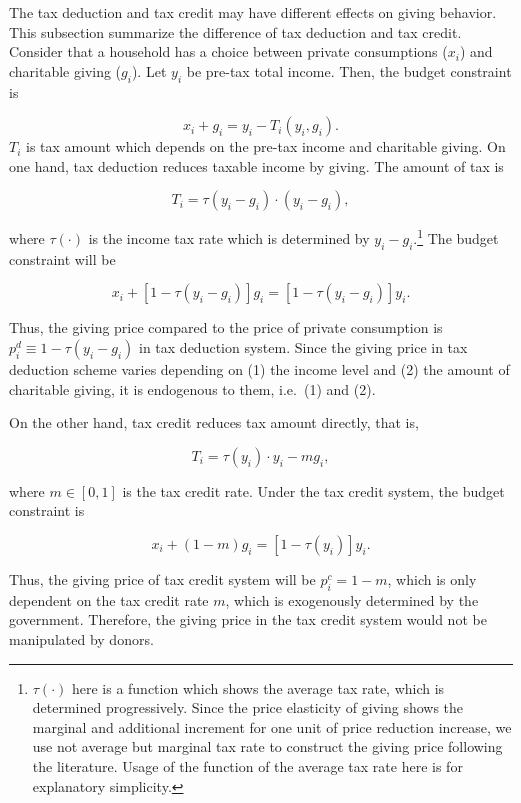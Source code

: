 \documentclass[
]{article}
\begin{document}
The tax deduction and tax credit may have different effects on giving behavior. This subsection summarize the difference of tax deduction and tax credit.
Consider that a household has a choice between private consumptions (\(x_i\)) and charitable giving (\(g_i\)). Let \(y_i\) be pre-tax total income.
Then, the budget constraint is

\[
    x_i + g_i = y_i - T_i(y_i, g_i).
\]
\(T_i\) is tax amount which depends on the pre-tax income and charitable giving.
On one hand, tax deduction reduces taxable income by giving. The amount of tax is

\[
    T_i = \tau(y_i - g_i) \cdot (y_i - g_i),
\]

where \(\tau(\cdot)\) is the income tax rate which is determined by \(y_i - g_i\).\footnote{\(\tau(\cdot)\) here is a function which shows the average tax rate, which is determined progressively. Since the price elasticity of giving shows the marginal and additional increment for one unit of price reduction increase, we use not average but marginal tax rate to construct the giving price following the literature. Usage of the function of the average tax rate here is for explanatory simplicity.} The budget constraint will be

\[
    x_i + [1 - \tau(y_i - g_i)]g_i = [1 - \tau(y_i - g_i)] y_i.
\]

Thus, the giving price compared to the price of private consumption is \(p_i^{d} \equiv 1 - \tau(y_i - g_i)\) in tax deduction system. Since the giving price in tax deduction scheme varies depending on (1) the income level and (2) the amount of charitable giving, it is endogenous to them, i.e.~(1) and (2).

On the other hand, tax credit reduces tax amount directly, that is,

\[
    T_i = \tau(y_i)\cdot y_i - m g_i,
\]

where \(m \in [0, 1]\) is the tax credit rate. Under the tax credit system, the budget constraint is

\[
    x_i + (1 - m) g_i = [1 - \tau(y_i)] y_i.
\]

Thus, the giving price of tax credit system will be \(p_i^c = 1 - m\), which is only dependent on the tax credit rate \(m\), which is exogenously determined by the government.
Therefore, the giving price in the tax credit system would not be manipulated by donors.
\end{document}
